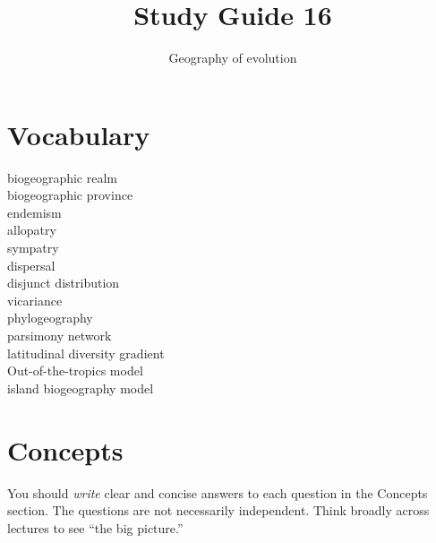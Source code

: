 \documentclass[letterpaper]{tufte-handout}
\title{Study Guide 16\hfill}
\author{Geography of evolution}
\date{} %
\begin{document}
\maketitle	%

\section{Vocabulary}

\begin{multicols}{2}
biogeographic realm \\
biogeographic province \\
endemism \\
allopatry \\
sympatry \\
dispersal \\
disjunct distribution \\
vicariance \\
phylogeography \\
parsimony network \\
latitudinal diversity gradient \\
Out-of-the-tropics model \\
island biogeography model
\end{multicols}


\section{Concepts}

You should \emph{write} clear and concise answers to each question in the Concepts section.  The questions are not necessarily independent.  Think broadly across lectures to see ``the big picture.'' 
\end{document}
